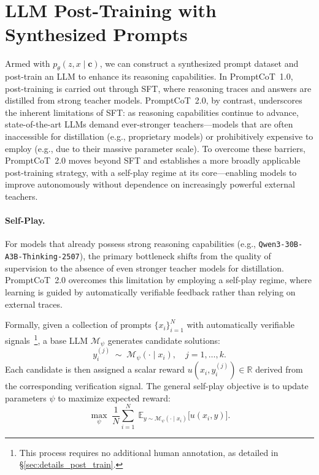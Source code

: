 \section{LLM Post-Training with Synthesized Prompts}
\label{sec:downstream}
Armed with $p_\theta(z, x \mid \mathbf{c})$, we can construct a synthesized prompt dataset and post-train an LLM to enhance its reasoning capabilities. In PromptCoT~1.0, post-training is carried out through SFT, where reasoning traces and answers are distilled from strong teacher models. PromptCoT~2.0, by contrast, underscores the inherent limitations of SFT: as reasoning capabilities continue to advance, state-of-the-art LLMs demand ever-stronger teachers—models that are often inaccessible for distillation (e.g., proprietary models) or prohibitively expensive to employ (e.g., due to their massive parameter scale). To overcome these barriers, PromptCoT~2.0 moves beyond SFT and establishes a more broadly applicable post-training strategy, with a self-play regime at its core—enabling models to improve autonomously without dependence on increasingly powerful external teachers.



\paragraph{Self-Play.}  
For models that already possess strong reasoning capabilities (e.g., \texttt{Qwen3-30B-A3B-Thinking-2507}), the primary bottleneck shifts from the quality of supervision to the absence of even stronger teacher models for distillation. PromptCoT~2.0 overcomes this limitation by employing a self-play regime, where learning is guided by automatically verifiable feedback rather than relying on external traces.




Formally, given a collection of prompts $\{x_i\}_{i=1}^N$ with automatically verifiable signals~\footnote{This process requires no additional human annotation, as detailed in \S\ref{sec:details_post_train}.}, a base LLM $\mathcal{M}_\psi$ generates candidate solutions:
\[
y_i^{(j)} \;\sim\; \mathcal{M}_\psi(\cdot \mid x_i), \quad j=1,\dots,k.
\]
Each candidate is then assigned a scalar reward $u(x_i, y_i^{(j)}) \in \mathbb{R}$ derived from the corresponding verification signal. 
The general self-play objective is to update parameters $\psi$ to maximize expected reward:  
\[
\max_{\psi} \; \frac{1}{N} \sum_{i=1}^N \; \mathbb{E}_{y \sim \mathcal{M}_\psi(\cdot \mid x_i)} \big[ u(x_i, y) \big].
\]  

